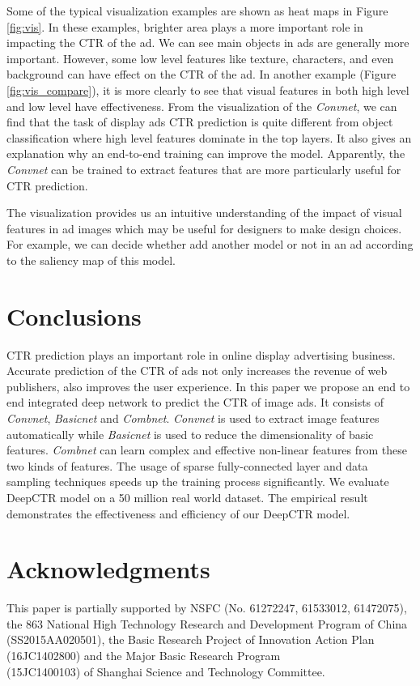 \documentclass{sig-alternate-05-2015}
\begin{document}
Some of the typical visualization examples are shown as heat maps  in Figure \ref{fig:vis}. In  these examples, brighter area plays a more important role in impacting the CTR of the ad. We can see main objects in ads are generally more important. However,  some low level features like texture, characters, and even background can have effect on the CTR of the ad. In another example (Figure \ref{fig:vis_compare}), it is more clearly to see that visual features in both high level and low level have effectiveness. From the visualization of the \emph{Convnet}, we can find that  the task of display ads CTR prediction is quite different from object classification where high level features dominate in the top layers.  It  also   gives an explanation why an end-to-end training can improve the model. Apparently, the \emph{Convnet} can be trained to extract features that are more particularly useful for CTR prediction.

The visualization provides us an intuitive understanding of the impact of visual features in ad images which  may be useful  for designers to make design choices. For example, we can decide whether add another model or not in an ad according to the saliency map of this model. 
\section{Conclusions}
CTR prediction plays an important role in online display advertising business. Accurate prediction of the CTR of ads not only increases the revenue of web publishers, also improves the user experience. In this paper we propose an end to end integrated deep network to predict the CTR of image ads.  It consists of \emph{Convnet}, \emph{Basicnet} and \emph{Combnet}. \emph{Convnet} is used to extract image features automatically while \emph{Basicnet} is used to reduce the dimensionality of basic features. \emph{Combnet} can learn complex and effective non-linear features from these two kinds of  features. The usage of sparse fully-connected layer and data sampling techniques speeds up the training process significantly.
We evaluate DeepCTR model on a 50 million real world dataset. The empirical result demonstrates 
the effectiveness and efficiency of our DeepCTR model. 
\section{Acknowledgments}
This paper is partially supported by NSFC (No. 61272247, 61533012, 61472075), the 863 National High Technology Research and Development Program of China (SS2015AA020501), the Basic Research Project of  Innovation Action Plan \\
(16JC1402800) and the Major Basic Research Program\\(15JC1400103) of Shanghai Science and Technology Committee.
\vfill\eject
%

%
\end{document}
